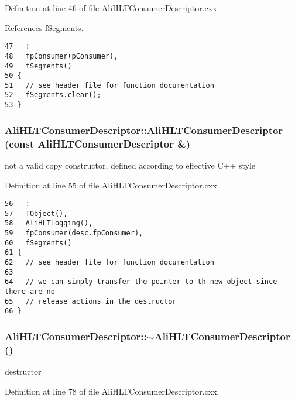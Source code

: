 Definition at line 46 of file Ali\-HLTConsumer\-Descriptor.cxx.

References f\-Segments.

\footnotesize\begin{verbatim}47   :
48   fpConsumer(pConsumer),
49   fSegments()
50 {
51   // see header file for function documentation
52   fSegments.clear();
53 }

\end{verbatim}\normalsize 


\subsubsection{\setlength{\rightskip}{0pt plus 5cm}Ali\-HLTConsumer\-Descriptor::Ali\-HLTConsumer\-Descriptor (const {\bf Ali\-HLTConsumer\-Descriptor} \&)}\label{classAliHLTConsumerDescriptor_a2}


not a valid copy constructor, defined according to effective C++ style 

Definition at line 55 of file Ali\-HLTConsumer\-Descriptor.cxx.

\footnotesize\begin{verbatim}56   :
57   TObject(),
58   AliHLTLogging(),
59   fpConsumer(desc.fpConsumer),
60   fSegments()
61 {
62   // see header file for function documentation
63 
64   // we can simply transfer the pointer to th new object since there are no
65   // release actions in the destructor
66 }

\end{verbatim}\normalsize 


\subsubsection{\setlength{\rightskip}{0pt plus 5cm}Ali\-HLTConsumer\-Descriptor::$\sim${\bf Ali\-HLTConsumer\-Descriptor} ()}\label{classAliHLTConsumerDescriptor_a4}


destructor 

Definition at line 78 of file Ali\-HLTConsumer\-Descriptor.cxx.


